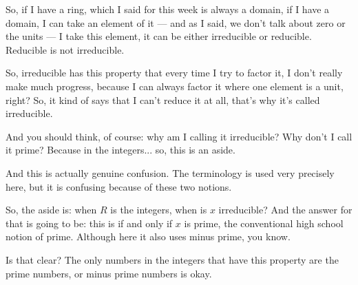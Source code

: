 \begin{speech}[00:07:50 - 00:09:28]
So, if I have a ring, which I said for this week is always a domain, if I have a domain, I can take an element of it --- and as I said, we don't talk about zero or the units --- I take this element, it can be either irreducible or reducible. Reducible is not irreducible.

So, irreducible has this property that every time I try to factor it, I don't really make much progress, because I can always factor it where one element is a unit, right? So, it kind of says that I can't reduce it at all, that's why it's called irreducible.

And you should think, of course: why am I calling it irreducible? Why don't I call it prime? Because in the integers... so, this is an aside. \inlinemetanote{writes: [Aside:}

And this is actually genuine confusion. The terminology is used very precisely here, but it is confusing because of these two notions.

So, the aside is: when $R$ is the integers,  when is $x$ irreducible?  And the answer for that is going to be: this is if and only if  $x$ is prime, \inlinemetanote{writes: $x$ is prime]} the conventional high school notion of prime. Although here it also uses minus prime, you know.

Is that clear? The only numbers in the integers that have this property are the prime numbers, or minus prime numbers is okay.
\end{speech}

